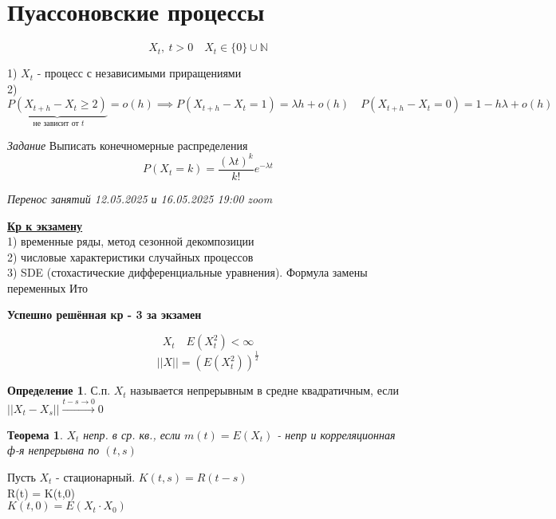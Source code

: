 \documentclass[a4paper]{article}
\newtheorem{theorem}{Теорема}
\theoremstyle{definition}
\newtheorem*{definition}{Определение}
\begin{document}
\section*{\centering Пуассоновские процессы}
\[
    X_t, \ t> 0 \quad X_t \in \{ 0 \} \cup \mathbb{N}
\]

1) $ X_t $ - процесс с независимыми приращениями\\
2) $ \underbrace{P(X_{t+h} - X_t \geq 2)}_{\text{ не зависит от } t} = o(h) \implies
P(X_{t+h} - X_t = 1) = \lambda h + o(h) \quad P(X_{t+h} - X_t = 0) = 1 - 
h \lambda + o(h)$ 

\emph{Задание} Выписать конечномерные распределения
\[
    P(X_t = k) = \frac{(\lambda t)^{k}}{k!} e^{-\lambda t}
\]

\emph{Перенос занятий 12.05.2025 и 16.05.2025 19:00 zoom}

\textbf{\underline{Кр к экзамену}}\\
1) временные ряды, метод сезонной декомпозиции\\
2) числовые характеристики случайных процессов\\
3) SDE (стохастические дифференциальные уравнения). Формула замены переменных
Ито

\vspace{5mm}
\textbf{Успешно решённая кр - 3 за экзамен}
\vspace{5mm}

\[
    X_t \quad E(X^2_t) < \infty
\]
\[
    ||X|| = (E(X^2_t))^{\frac{1}{2} }
\]

\begin{tcolorbox}
\begin{definition}
    С.п. $ X_t $ называется непрерывным в средне квадратичным, если $ ||X_t - X_s||
    \xrightarrow{t - s \to 0} 0$ 
\end{definition}
\end{tcolorbox}

\begin{tcolorbox}
\begin{theorem}
    $ X_t $ непр. в ср. кв., если $ m(t) = E(X_t) $ - непр и корреляционная ф-я
    непрерывна по $ (t,s) $ 
\end{theorem}
\end{tcolorbox}

Пусть $ X_t $ - стационарный. $ K(t,s) = R(t-s)$ \\
R(t) = K(t,0)\\
$K(t,0) = E(X_t \cdot X_0) $
\end{document}
